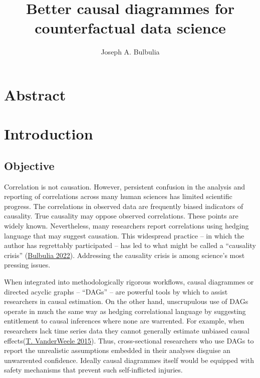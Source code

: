 \documentclass[
  singlecolumn]{report}
\title{Better causal diagrammes for counterfactual data science}
\author{Joseph A. Bulbulia}
\date{}
\begin{document}
\maketitle
\ifdefined\Shaded\renewenvironment{Shaded}{\begin{tcolorbox}[sharp corners, frame hidden, boxrule=0pt, interior hidden, borderline west={3pt}{0pt}{shadecolor}, breakable, enhanced]}{\end{tcolorbox}}\fi

\listoffigures
\listoftables
\hypertarget{abstract}{%
\section{Abstract}\label{abstract}}

\hypertarget{introduction}{%
\section{Introduction}\label{introduction}}

\hypertarget{objective}{%
\subsection{Objective}\label{objective}}

Correlation is not causation. However, persistent confusion in the
analysis and reporting of correlations across many human sciences has
limited scientific progress. The correlations in observed data are
frequently biased indicators of causality. True causality may oppose
observed correlations. These points are widely known. Nevertheless, many
researchers report correlations using hedging language that may suggest
causation. This widespread practice -- in which the author has
regrettably participated -- has led to what might be called a
``causality crisis'' (\protect\hyperlink{ref-bulbulia2022}{Bulbulia
2022}). Addressing the causality crisis is among science's most pressing
issues.

When integrated into methodologically rigorous workflows, causal
diagrammes or directed acyclic graphs -- ``DAGs'' -- are powerful tools
by which to assist researchers in causal estimation. On the other hand,
unscrupulous use of DAGs operate in much the same way as hedging
correlational language by suggesting entitlement to causal inferences
where none are warrented. For example, when researchers lack time series
data they cannot generally estimate unbiased causal
effects(\protect\hyperlink{ref-vanderweele2015}{T. VanderWeele 2015}).
Thus, cross-sectional researchers who use DAGs to report the unrealistic
assumptions embedded in their analyses disguise an unwarrented
confidence. Ideally causal diagrammes itself would be equipped with
safety mechanisms that prevent such self-inflicted injuries.
\end{document}
